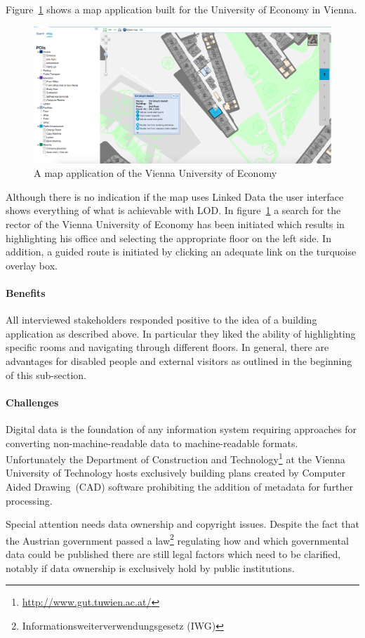 \documentclass{article}
\begin{document}
Figure~\ref{fig:um-map-app} shows a map application built for the University of Economy in Vienna. 
\begin{figure}[H]
	\centering \includegraphics*[width=.8\columnwidth]{map_wu_wien.png}
	\caption{A map application of the Vienna University of Economy}
	\label{fig:um-map-app}
\end{figure}
Although there is no indication if the map uses Linked Data the user interface shows everything of what is achievable with LOD. 
In figure~\ref{fig:um-map-app} a search for the rector of the Vienna University of Economy has been initiated which results in highlighting his office and selecting the appropriate floor on the left side. In addition, a guided route is initiated by clicking an adequate link on the turquoise overlay box. 
\paragraph{Benefits}
All interviewed stakeholders responded positive to the idea of a building application as described above. In particular they liked the ability of highlighting specific rooms and navigating through different floors. In general, there are advantages for disabled people and external visitors as outlined in the beginning of this sub-section. 

\paragraph{Challenges}
Digital data is the foundation of any information system requiring approaches for converting non-machine-readable data to machine-readable formats. Unfortunately the Department of Construction and Technology\footnote{\url{http://www.gut.tuwien.ac.at/}} at the Vienna University of Technology hosts exclusively building plans created by Computer Aided Drawing~(CAD) software prohibiting the addition of metadata for further processing. 

Special attention needs data ownership and copyright issues. Despite the fact that the Austrian government passed a law\footnote{Informationsweiterverwendungsgesetz (IWG)} regulating how and which governmental data could be published there are still legal factors which need to be clarified, notably if data ownership is exclusively hold by public institutions. 
\end{document}
